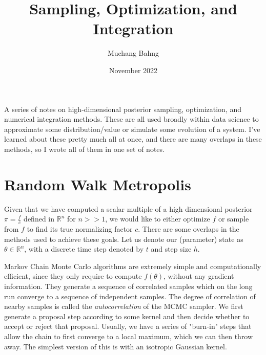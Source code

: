 \documentclass{article}
\begin{document}
\title{Sampling, Optimization, and Integration}
\author{Muchang Bahng}
\date{November 2022}

\maketitle
\tableofcontents
\pagebreak

A series of notes on high-dimensional posterior sampling, optimization, and numerical integration methods. These are all used broadly within data science to approximate some distribution/value or simulate some evolution of a system. I've learned about these pretty much all at once, and there are many overlaps in these methods, so I wrote all of them in one set of notes. 

\section{Random Walk Metropolis}

    Given that we have computed a scalar multiple of a high dimensional posterior $\pi = \frac{f}{c}$ defined in $\mathbb{R}^n$ for $n >> 1$, we would like to either optimize $f$ or sample from $f$ to find its true normalizing factor $c$. There are some overlaps in the methods used to achieve these goals. Let us denote our (parameter) state as $\theta \in \mathbb{R}^n$, with a discrete time step denoted by $t$ and step size $h$. 

    Markov Chain Monte Carlo algorithms are extremely simple and computationally efficient, since they only require to compute $f(\theta)$, without any gradient information. They generate a sequence of correlated samples which on the long run converge to a sequence of independent samples. The degree of correlation of nearby samples is called the \textit{autocorrelation} of the MCMC sampler. We first generate a proposal step according to some kernel and then decide whether to accept or reject that proposal. Usually, we have a series of "burn-in" steps that allow the chain to first converge to a local maximum, which we can then throw away. The simplest version of this is with an isotropic Gaussian kernel. 
\end{document}
